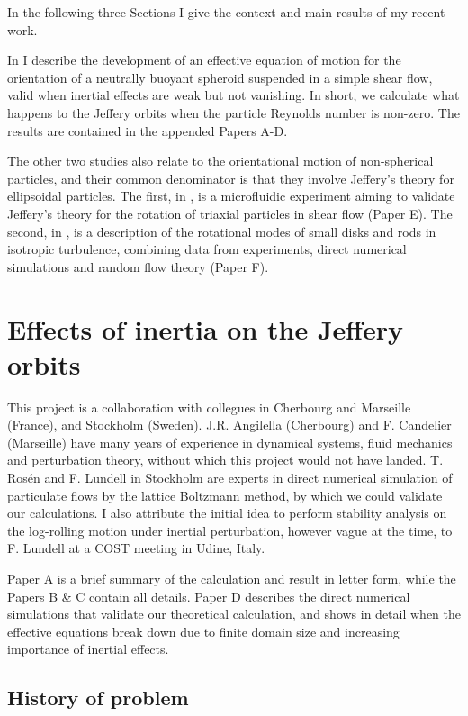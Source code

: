 \documentclass[thesis.tex]{subfiles}
\begin{document}
In the following three Sections I give the context and main results of my recent work. 

In  I describe the development of an effective equation of motion for the orientation of a neutrally buoyant spheroid suspended in a simple shear flow, valid when inertial effects are weak but not vanishing. In short, we calculate what happens to the Jeffery orbits when the particle Reynolds number is non-zero. The results are contained in the appended Papers A-D.

The other two studies also relate to the orientational motion of non-spherical particles, and their common denominator is that they involve Jeffery's theory for ellipsoidal particles.
The first, in , is a microfluidic experiment aiming to validate Jeffery's theory for the rotation of triaxial particles in shear flow (Paper E). The second, in , is a description of the rotational modes of small disks and rods in isotropic turbulence, combining data from experiments, direct numerical simulations and random flow theory (Paper F).

\chapter[Effects of inertia]{Effects of inertia on the Jeffery orbits}\label{sec:effective}

This project is a collaboration with collegues in Cherbourg and Marseille (France), and Stockholm (Sweden). J.R. Angilella (Cherbourg) and F. Candelier (Marseille) have many years of experience in dynamical systems, fluid mechanics and perturbation theory, without which this project would not have landed. T. Ros\'en and F. Lundell in Stockholm are experts in direct numerical simulation of particulate flows by the lattice Boltzmann method, by which we could validate our calculations. I also attribute the initial idea to perform stability analysis on the log-rolling motion under inertial perturbation, however vague at the time, to F. Lundell at a COST meeting in Udine, Italy. 

Paper A is a brief summary of the calculation and result in letter form, while the Papers B \& C contain all details. Paper D describes the direct numerical simulations that validate our theoretical calculation, and shows in detail when the effective equations break down due to finite domain size and increasing importance of inertial effects.

\section{History of problem}
\end{document}
